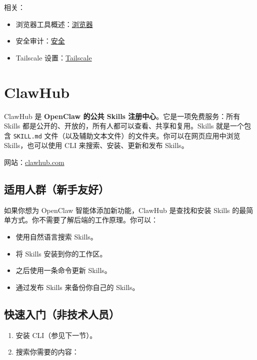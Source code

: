 相关：

\begin{itemize}
  \item 浏览器工具概述：\href{/tools/browser}{浏览器}
  \item 安全审计：\href{/gateway/security}{安全}
  \item Tailscale 设置：\href{/gateway/tailscale}{Tailscale}
\end{itemize}



\clearpage

\section{ClawHub}


ClawHub 是 \textbf{OpenClaw 的公共 Skills 注册中心}。它是一项免费服务：所有 Skills 都是公开的、开放的，所有人都可以查看、共享和复用。Skills 就是一个包含 \texttt{SKILL.md} 文件（以及辅助文本文件）的文件夹。你可以在网页应用中浏览 Skills，也可以使用 CLI 来搜索、安装、更新和发布 Skills。

网站：\href{https://clawhub.com}{clawhub.com}

\subsection{适用人群（新手友好）}


如果你想为 OpenClaw 智能体添加新功能，ClawHub 是查找和安装 Skills 的最简单方式。你不需要了解后端的工作原理。你可以：

\begin{itemize}
  \item 使用自然语言搜索 Skills。
  \item 将 Skills 安装到你的工作区。
  \item 之后使用一条命令更新 Skills。
  \item 通过发布 Skills 来备份你自己的 Skills。
\end{itemize}


\subsection{快速入门（非技术人员）}


\begin{enumerate}
  \item 安装 CLI（参见下一节）。
  \item 搜索你需要的内容：
\end{enumerate}

